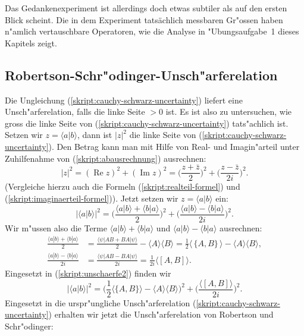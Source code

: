 Das Gedankenexperiment ist allerdings doch etwas subtiler als auf den
ersten Blick scheint. 
Die in dem Experiment tatsächlich messbaren Gr"ossen haben n"amlich
vertauschbare Operatoren, wie die Analyse in "Ubungsaufgabe~1 dieses
Kapitels zeigt.


\subsection{Robertson-Schr"odinger-Unsch"arferelation}
Die Ungleichung (\ref{skript:cauchy-schwarz-uncertainty}) liefert eine
Unsch"arferelation, falls die linke Seite $>0$ ist. Es ist
also zu untersuchen, wie gross die linke Seite von 
(\ref{skript:cauchy-schwarz-uncertainty}) tats"achlich ist.
Setzen wir $z=\langle a|b\rangle$, dann ist $|z|^2$ die linke Seite
von (\ref{skript:cauchy-schwarz-uncertainty}). Den Betrag kann man mit Hilfe
von Real- und Imagin"arteil unter Zuhilfenahme von (\ref{skript:abausrechnung})
ausrechnen:
\[
|z|^2
=
(\operatorname{Re}z)^2+(\operatorname{Im}z)^2
=
\biggl(\frac{z+\bar z}2\biggr)^2 + \biggl(\frac{z-\bar z}{2i}\biggr)^2.
\]
(Vergleiche hierzu auch die Formeln (\ref{skript:realteil-formel}) und 
(\ref{skript:imaginaerteil-formel})).
Jetzt setzen wir $z=\langle a|b\rangle$ ein:
\begin{equation}
|\langle a|b\rangle|^2
=
\biggl(\frac{\langle a|b\rangle + \langle b|a\rangle}2\biggr)^2
+
\biggl(\frac{\langle a|b\rangle - \langle b|a\rangle}{2i}\biggr)^2.
\label{skript:unschaerfe2}
\end{equation}
Wir m"ussen also die Terme $\langle a|b\rangle + \langle b|a\rangle$
und $\langle a|b\rangle - \langle b|a\rangle$ ausrechnen:
\begin{align*}
\frac{\langle a|b\rangle + \langle b|a\rangle}2
&=
\frac{
\langle\psi|AB+BA|\psi\rangle 
}2
-\langle A\rangle\langle B\rangle
=
\frac12 \langle\,\{A,B\}\,\rangle - \langle A\rangle\langle B\rangle,
\\
\frac{\langle a|b\rangle - \langle b|a\rangle}{2i}
&=
\frac{\langle\psi|AB-BA|\psi\rangle}{2i}
=
\frac1{2i}\langle [A,B]\rangle.
\end{align*}
Eingesetzt in (\ref{skript:unschaerfe2}) finden wir
\[
|\langle a|b\rangle|^2
=
\biggl(
\frac12\langle \{A,B\}\rangle - \langle A\rangle\langle B\rangle
\biggr)^2
+
\biggl(
\frac{\langle[A,B]\rangle}{2i}
\biggr)^2.
\]
Eingesetzt in die urspr"ungliche Unsch"arferelation
(\ref{skript:cauchy-schwarz-uncertainty}) erhalten wir jetzt die Unsch"arferelation
von Robertson und Schr"odinger:

